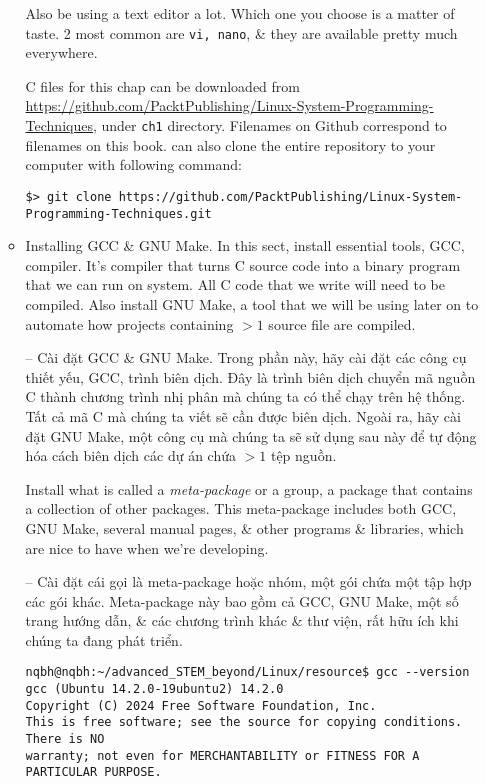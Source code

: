 \documentclass{article}
\begin{document}
\begin{itemize}
\begin{itemize}
        Also be using a text editor a lot. Which one you choose is a matter of taste. 2 most common are {\tt vi, nano}, \& they are available pretty much everywhere.
        
        C files for this chap can be downloaded from \url{https://github.com/PacktPublishing/Linux-System-Programming-Techniques}, under {\tt ch1} directory. Filenames on Github correspond to filenames on this book. can also clone the entire repository to your computer with following command:
        \begin{verbatim}
$> git clone https://github.com/PacktPublishing/Linux-System-Programming-Techniques.git
        \end{verbatim}
        \item {\sf Installing GCC \& GNU Make.} In this sect, install essential tools, GCC, compiler. It's compiler that turns C source code into a binary program that we can run on system. All C code that we write will need to be compiled. Also install GNU Make, a tool that we will be using later on to automate how projects containing $> 1$ source file are compiled.
        
        -- {\sf Cài đặt GCC \& GNU Make.} Trong phần này, hãy cài đặt các công cụ thiết yếu, GCC, trình biên dịch. Đây là trình biên dịch chuyển mã nguồn C thành chương trình nhị phân mà chúng ta có thể chạy trên hệ thống. Tất cả mã C mà chúng ta viết sẽ cần được biên dịch. Ngoài ra, hãy cài đặt GNU Make, một công cụ mà chúng ta sẽ sử dụng sau này để tự động hóa cách biên dịch các dự án chứa $> 1$ tệp nguồn.
        
        Install what is called a {\it meta-package} or a group, a package that contains a collection of other packages. This meta-package includes both GCC, GNU Make, several manual pages, \& other programs \& libraries, which are nice to have when we're developing.
        
        -- Cài đặt cái gọi là meta-package hoặc nhóm, một gói chứa một tập hợp các gói khác. Meta-package này bao gồm cả GCC, GNU Make, một số trang hướng dẫn, \& các chương trình khác \& thư viện, rất hữu ích khi chúng ta đang phát triển.
        
        \begin{verbatim}
nqbh@nqbh:~/advanced_STEM_beyond/Linux/resource$ gcc --version
gcc (Ubuntu 14.2.0-19ubuntu2) 14.2.0
Copyright (C) 2024 Free Software Foundation, Inc.
This is free software; see the source for copying conditions.  There is NO
warranty; not even for MERCHANTABILITY or FITNESS FOR A PARTICULAR PURPOSE.


\end{verbatim}
\end{itemize}
\end{itemize}
\end{document}
